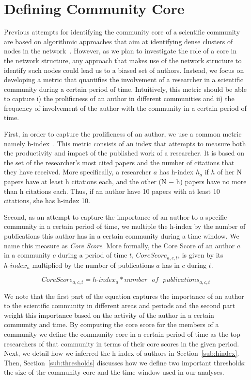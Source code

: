 \section{Defining Community Core}

Previous attempts for identifying the community core of a scientific community are based on algorithmic approaches that aim at identifying dense clusters of nodes in the
network~\cite{Seifi:2012:CCE:2187980.2188258}.  However, as we plan to investigate the role of a core in the network structure, any approach that makes use of the network structure
to identify such nodes could lead us to a biased set of authors. Instead, we focus on developing a metric that quantifies the involvement of a researcher in a scientific community
during a certain period of time.  Intuitively, this metric should be able to capture i) the prolificness of an author in different communities and ii) the frequency of involvement
of the author with the community in a certain period of time.

First, in order to capture the prolificness of an author, we use a common metric namely h-index~\cite{Hirsch:2005}. This metric consists of an index that attempts to measure both
the productivity and impact of the published work of a researcher. It is based on the set of the researcher's most cited papers and the number of citations that they have received.
More specifically, a researcher $a$ has h-index $h_a$ if $h$ of her N papers have at least h citations each, and the other (N − h) papers have no more than h citations each. Thus,
if an author have 10 papers with at least 10 citations, she has h-index 10.  

Second, as an attempt to capture the importance of an author to a specific community in a certain period of time, we multiple the h-index by the number of publications this author
has in a certain community during a time window. We name this measure as \textit{Core Score}. More formally, the Core Score of an author $a$ in a community $c$ during a period of
time $t$, $Core{ }Score_{a,c,t}$, is given by its $h\textrm{-}index_a$ multiplied by the number of publications $a$ has in $c$ during $t$.

\begin{equation} 
  \label{eq:core_score}
  Core{ }Score_{a,c,t} = h\textrm{-}index_a * number\textrm{ }of\textrm{ }publications_{a,c,t}
\end{equation}

We note that the first part of the equation captures the importance of an author to the scientific community in different areas and periods and the second part weight this
importance based on the activity of the author in a certain community and time.  By computing the core score for the members of a community we define the community core in a
certain period of time as the top researchers of that community in terms of their core scores in the given period. Next, we detail how we inferred the h-index of authors in
Section~\ref{sub:hindex}.  Then, Section~\ref{sub:thresholds} discusses how we define two important thresholds: the size of the community core and the time window used in our
analyses.


